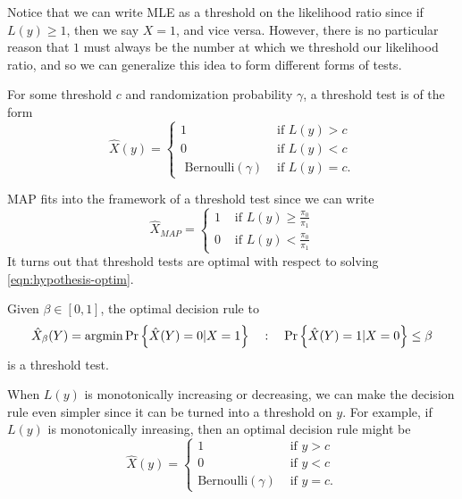 Notice that we can write MLE as a threshold on the likelihood ratio since if $L(y) \geq 1$, then we say $X=1$, and vice versa.
However, there is no particular reason that $1$ must always be the number at which we threshold our likelihood ratio, and so we can generalize this idea to form different forms of tests.
\begin{definition}
	For some threshold $c$ and randomization probability $\gamma$, a threshold test is of the form
	\[
		\hat{X}(y) = \begin{cases}
			1 & \text{ if } L(y) > c\\
			0 & \text{ if } L(y) < c\\
			\text{ Bernoulli}(\gamma) & \text { if } L(y) = c.
		\end{cases}
	\]
	\label{defn:threshold-test}
\end{definition}
MAP fits into the framework of a threshold test since we can write
\[
	\hat{X}_{MAP} = \begin{cases}
		1 & \text{ if } L(y) \geq \frac{\pi_0}{\pi_1}\\
		0 & \text{ if } L(y) < \frac{\pi_0}{\pi_1}
	\end{cases}
\]
It turns out that threshold tests are optimal with respect to solving \cref{eqn:hypothesis-optim}.
\begin{theorem}
	Given $\beta\in[0, 1]$, the optimal decision rule to \[
		\hat{X}_\beta(Y) = \operatorname*{argmin} \text{Pr}\left\{\hat{X}(Y)=0 | X=1\right\} \quad : \quad \text{Pr}\left\{\hat{X}(Y)=1|X=0\right\} \leq \beta
	\]
	is a threshold test.
	\label{thm:neyman-pearson}
\end{theorem}
When $L(y)$ is monotonically increasing or decreasing, we can make the decision rule even simpler since it can be turned into a threshold on $y$.
For example, if $L(y)$ is monotonically inreasing, then an optimal decision rule might be
\[
	\hat{X}(y) = \begin{cases}
		1 & \text{ if } y > c\\
		0 & \text{ if } y < c\\
		\text{Bernoulli}(\gamma) & \text{ if } y = c.
	\end{cases}
\]

